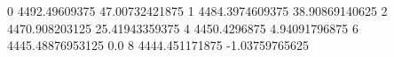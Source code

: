 0 4492.49609375 47.00732421875
1 4484.3974609375 38.90869140625
2 4470.908203125 25.41943359375
4 4450.4296875 4.94091796875
6 4445.48876953125 0.0
8 4444.451171875 -1.03759765625
